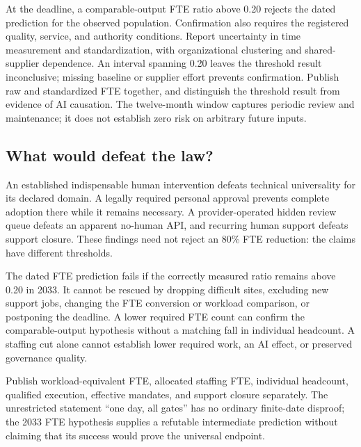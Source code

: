 At the deadline, a comparable-output FTE ratio above 0.20 rejects the dated prediction for the
observed population. Confirmation also requires the registered quality, service, and authority
conditions. Report uncertainty in time measurement and standardization, with organizational clustering
and shared-supplier dependence. An interval spanning 0.20 leaves the threshold result inconclusive;
missing baseline or supplier effort prevents confirmation. Publish raw and standardized FTE together,
and distinguish the threshold result from evidence of AI causation. The twelve-month window captures
periodic review and maintenance; it does not establish zero risk on arbitrary future inputs.

\subsection{What would defeat the law?}

An established indispensable human intervention defeats technical universality for its declared
domain. A legally required personal approval prevents complete adoption there while it remains
necessary. A provider-operated hidden review queue defeats an apparent no-human API, and recurring
human support defeats support closure. These findings need not reject an 80\% FTE reduction:
the claims have different thresholds.

The dated FTE prediction fails if the correctly measured ratio remains above 0.20 in 2033.
It cannot be rescued by dropping difficult sites, excluding new support jobs, changing the FTE conversion or workload
comparison, or postponing the deadline. A lower required FTE count can confirm the comparable-output hypothesis
without a matching fall in individual headcount. A staffing cut alone cannot establish lower required
work, an AI effect, or preserved governance quality.

Publish workload-equivalent FTE, allocated staffing FTE, individual headcount, qualified execution, effective mandates, and support
closure separately. The unrestricted statement ``one day, all gates'' has no ordinary finite-date
disproof; the 2033 FTE hypothesis supplies a refutable intermediate prediction without claiming
that its success would prove the universal endpoint.
